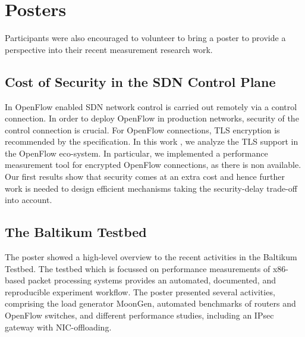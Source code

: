 \section{Posters}\label{sec:posters}

Participants were also encouraged to volunteer to bring a poster to provide a
perspective into their recent measurement research work.

\subsection{Cost of Security in the SDN Control Plane}

In OpenFlow enabled \ac{SDN} network control is carried out remotely via a
control connection. In order to deploy OpenFlow in production networks,
security of the control connection is crucial. For OpenFlow connections, TLS
encryption is recommended by the specification. In this work
\cite{wkellerer:conext:2015}, we analyze the TLS support in the OpenFlow
eco-system. In particular, we implemented a performance measurement tool for
encrypted OpenFlow connections, as there is non available.  Our first results
show that security comes at an extra cost and hence further work is needed to
design efficient mechanisms taking the security-delay trade-off into account.


\subsection{The Baltikum Testbed}

The poster showed a high-level overview to the recent activities in the
Baltikum Testbed. The testbed which is focussed on performance measurements of
x86-based packet processing systems provides an automated, documented, and
reproducible experiment workflow. The poster presented several activities,
comprising the load generator MoonGen, automated benchmarks of routers and
OpenFlow switches, and different performance studies, including an IPsec
gateway with NIC-offloading.

